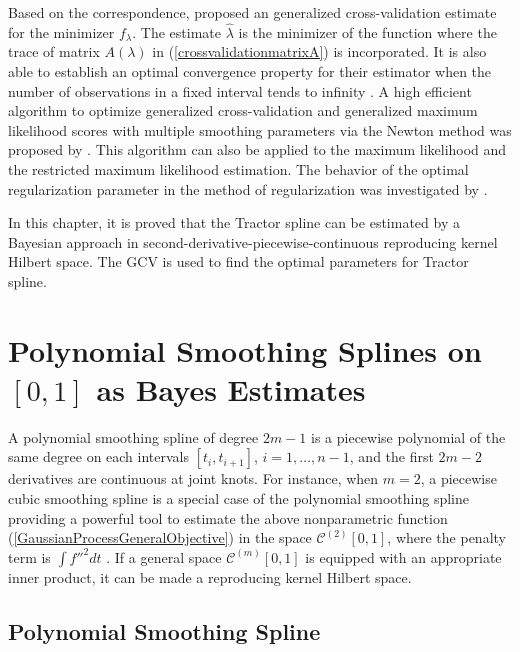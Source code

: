 Based on the correspondence, \cite{craven1978smoothing} proposed an generalized cross-validation estimate for the minimizer $f_\lambda$. The estimate $\hat{\lambda}$ is the minimizer of the function where the trace of matrix $A(\lambda)$ in (\ref{crossvalidationmatrixA}) is incorporated. It is also able to establish an optimal convergence property for their estimator when the number of observations in a fixed interval tends to infinity \cite{wecker1983signal}. A high efficient algorithm to optimize generalized cross-validation and generalized maximum likelihood scores with multiple smoothing parameters via the Newton method was proposed by \cite{gu1991minimizing}. This algorithm can also be applied to the maximum likelihood and the restricted maximum likelihood estimation. The behavior of the optimal regularization parameter in the method of regularization was investigated by \cite{wahba1990optimal}. 


In this chapter, it is proved that the Tractor spline can be estimated by a Bayesian approach in second-derivative-piecewise-continuous reproducing kernel Hilbert space. The GCV is used to find the optimal parameters for Tractor spline. 



\section{Polynomial Smoothing Splines on $[0, 1]$ as Bayes Estimates}

A polynomial smoothing spline of degree $2m-1$ is a piecewise polynomial of the same degree on each intervals $[t_i,t_{i+1}]$, $i=1, \ldots, n-1$, and the first $2m-2$ derivatives are continuous at joint knots. For instance, when $m=2$,  a piecewise cubic smoothing spline is a special case of the polynomial smoothing spline providing a powerful tool to estimate the above nonparametric function (\ref{GaussianProcessGeneralObjective}) in the space  $\mathcal{C}^{(2)}[0,1]$, where the penalty term is $\int f''^2dt$ \cite{hastie1990generalized}  \cite{wang1998smoothing}. If a general space $\mathcal{C}^{(m)}[0,1]$ is equipped with an appropriate inner product, it can be made a reproducing kernel Hilbert space. 

\subsection{Polynomial Smoothing Spline}

